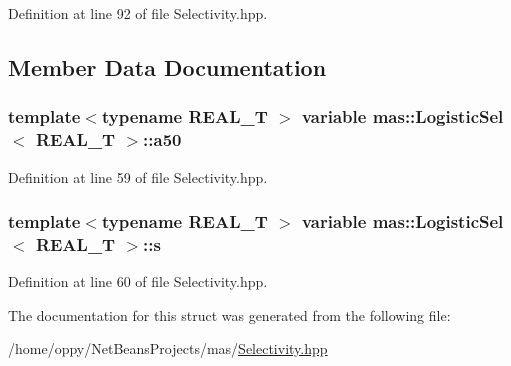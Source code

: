 Definition at line 92 of file Selectivity.\-hpp.



\subsection{Member Data Documentation}
\hypertarget{structmas_1_1_logistic_sel_a2aab2cd35ed2fa7fb0780c810fefb91a}{
\subsubsection[{a50}]{\setlength{\rightskip}{0pt plus 5cm}template$<$typename R\-E\-A\-L\-\_\-\-T $>$ {\bf variable} {\bf mas\-::\-Logistic\-Sel}$<$ R\-E\-A\-L\-\_\-\-T $>$\-::a50}}\label{structmas_1_1_logistic_sel_a2aab2cd35ed2fa7fb0780c810fefb91a}


Definition at line 59 of file Selectivity.\-hpp.

\hypertarget{structmas_1_1_logistic_sel_a2358849095acf217deae4f595b670d2f}{
\subsubsection[{s}]{\setlength{\rightskip}{0pt plus 5cm}template$<$typename R\-E\-A\-L\-\_\-\-T $>$ {\bf variable} {\bf mas\-::\-Logistic\-Sel}$<$ R\-E\-A\-L\-\_\-\-T $>$\-::s}}\label{structmas_1_1_logistic_sel_a2358849095acf217deae4f595b670d2f}


Definition at line 60 of file Selectivity.\-hpp.



The documentation for this struct was generated from the following file\-:\begin{DoxyCompactItemize}
\item 
/home/oppy/\-Net\-Beans\-Projects/mas/\hyperlink{_selectivity_8hpp}{Selectivity.\-hpp}\end{DoxyCompactItemize}
